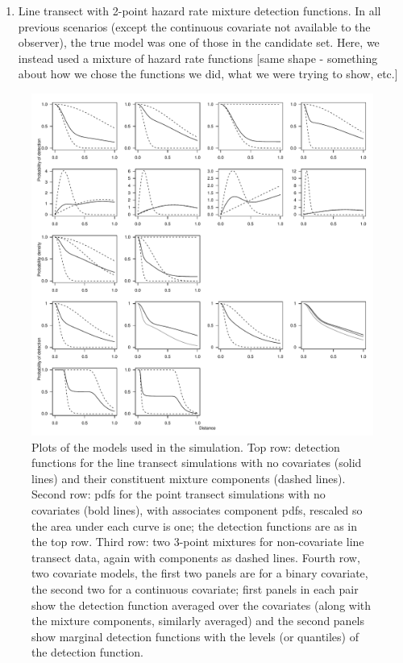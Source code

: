 \documentclass[useAMS,referee]{biom}
\begin{document}
\begin{enumerate}
  \item Line transect with 2-point hazard rate mixture detection functions.  In all previous scenarios (except the continuous covariate not available to the observer), the true model was one of those in the candidate set.  Here, we instead used a mixture of hazard rate functions [same shape - something about how we chose the functions we did, what we were trying to show, etc.]
\end{enumerate}



\begin{figure}
\centering
\includegraphics[width=\textwidth]{figs/sim-detfct.pdf}
\caption{Plots of the models used in the simulation. Top row: detection functions for the line transect simulations with no covariates (solid lines) and their constituent mixture components (dashed lines). Second row: pdfs for the point transect simulations with no covariates (bold lines), with associates component pdfs, rescaled so the area under each curve is one; the detection functions are as in the top row. Third row: two 3-point mixtures for non-covariate line transect data, again with components as dashed lines. Fourth row, two covariate models, the first two panels are for a binary covariate, the second two for a continuous covariate; first panels in each pair show the detection function averaged over the covariates (along with the mixture components, similarly averaged) and the second panels show marginal detection functions with the levels (or quantiles) of the detection function.}
\label{sim-detfcts}
\end{figure}
\end{document}
